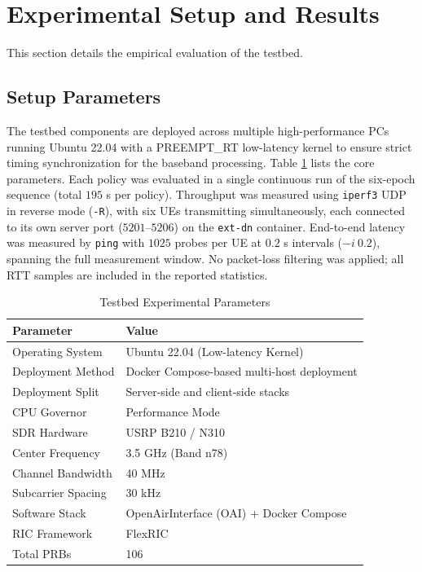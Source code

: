 \documentclass[conference, a4paper]{IEEEtran}
\begin{document}
\section{Experimental Setup and Results}
This section details the empirical evaluation of the testbed.

\subsection{Setup Parameters}
The testbed components are deployed across multiple high-performance PCs running Ubuntu 22.04 with a PREEMPT\_RT low-latency kernel to ensure strict timing synchronization for the baseband processing. Table \ref{tab:parameters} lists the core parameters. Each policy was evaluated in a single continuous run of the six-epoch sequence (total $195$ s per policy). Throughput was measured using \texttt{iperf3} UDP in reverse mode (\texttt{-R}), with six UEs transmitting simultaneously, each connected to its own server port ($5201$--$5206$) on the \texttt{ext-dn} container. End-to-end latency was measured by \texttt{ping} with $1025$ probes per UE at $0.2$ s intervals ($-i\ 0.2$), spanning the full measurement window. No packet-loss filtering was applied; all RTT samples are included in the reported statistics.

\begin{table}[htbp]
\caption{Testbed Experimental Parameters}
\centering
\begin{tabular}{ll}
\toprule
\textbf{Parameter} & \textbf{Value} \\
\midrule
Operating System & Ubuntu 22.04 (Low-latency Kernel) \\
Deployment Method & Docker Compose-based multi-host deployment \\
Deployment Split & Server-side and client-side stacks \\
CPU Governor & Performance Mode \\
SDR Hardware & USRP B210 / N310 \\
Center Frequency & 3.5 GHz (Band n78) \\
Channel Bandwidth & 40 MHz \\
Subcarrier Spacing & 30 kHz \\
Software Stack & OpenAirInterface (OAI) + Docker Compose \\
RIC Framework & FlexRIC \\
Total PRBs & 106 \\
\bottomrule
\end{tabular}
\label{tab:parameters}
\end{table}
\end{document}
